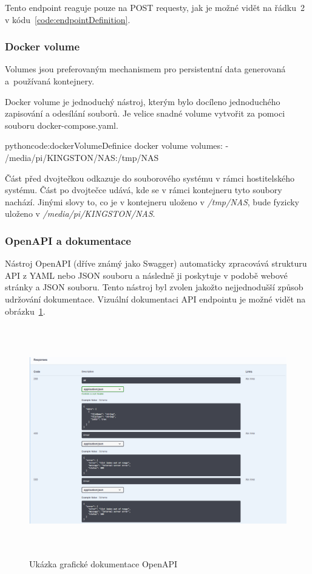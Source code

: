 \documentclass[
  glossaries,
]{kidiplom}
\begin{document}
Tento endpoint reaguje pouze na POST requesty, jak je možné vidět na řádku~2 v kódu~\ref{code:endpointDefinition}.

\subsubsection{Docker volume}
Volumes jsou preferovaným mechanismem pro persistentní data generovaná a~používaná kontejnery. \cite{DOCKERvolume}

Docker volume je jednoduchý nástroj, kterým bylo docíleno jednoduchého zapisování a odesílání souborů. Je velice snadné volume vytvořit za pomoci souboru docker-compose.yaml.
\begin{kicode}{python}{code:dockerVolume}{Definice docker volume}
        volumes:
            - /media/pi/KINGSTON/NAS:/tmp/NAS
\end{kicode}

Část před dvojtečkou odkazuje do souborového systému v rámci hostitelského systému. Část po dvojtečce udává, kde se v rámci kontejneru tyto soubory nachází. Jinými slovy to, co je v kontejneru uloženo v \textit{/tmp/NAS}, bude fyzicky uloženo v \textit{/media/pi/KINGSTON/NAS}.

\subsubsection{OpenAPI a dokumentace}
Nástroj OpenAPI (dříve známý jako Swagger) automaticky zpracovává strukturu API z YAML nebo JSON souboru a následně ji poskytuje v podobě webové stránky a JSON souboru. Tento nástroj byl zvolen jakožto nejjednodušší způsob udržování dokumentace. Vizuální dokumentaci API endpointu je možné vidět na obrázku~\ref{fig:openapi}.

\begin{figure}[htp]
    \centering
    \includegraphics[width=14cm,height=10cm,keepaspectratio]{openapi}
    \caption{Ukázka grafické dokumentace OpenAPI}
    \label{fig:openapi}
\end{figure}
\end{document}
